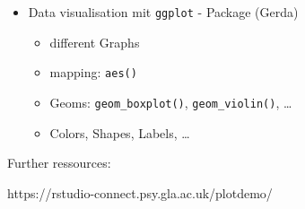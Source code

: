 \documentclass[
  letterpaper,
  DIV=11,
  numbers=noendperiod]{scrreprt}
\begin{document}
\begin{itemize}
\item
  Data visualisation mit \texttt{ggplot} - Package (Gerda)

  \begin{itemize}
  \item
    different Graphs
  \item
    mapping: \texttt{aes()}
  \item
    Geoms: \texttt{geom\_boxplot()}, \texttt{geom\_violin()}, \ldots{}
  \item
    Colors, Shapes, Labels, \ldots{}
  \end{itemize}
\end{itemize}

Further ressources:

https://rstudio-connect.psy.gla.ac.uk/plotdemo/
\end{document}
